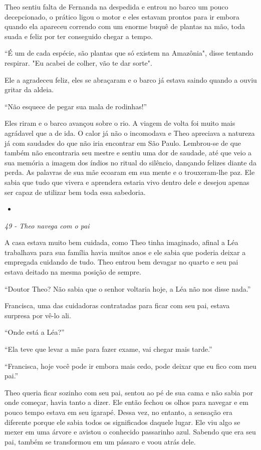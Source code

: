Theo sentiu falta de Fernanda na despedida e entrou no barco um pouco
decepcionado, o prático ligou o motor e eles estavam prontos para ir
embora quando ela apareceu correndo com um enorme buquê de plantas na
mão, toda suada e feliz por ter conseguido chegar a tempo.

``É um de cada espécie, são plantas que só existem na Amazônia", disse
tentando respirar. "Eu acabei de colher, vão te dar sorte".

Ele a agradeceu feliz, eles se abraçaram e o barco já estava saindo
quando a ouviu gritar da aldeia.

``Não esquece de pegar sua mala de rodinhas!''

Eles riram e o barco avançou sobre o rio. A viagem de volta foi muito
mais agrádavel que a de ida. O calor já não o incomodava e Theo
apreciava a natureza já com saudades do que não iria encontrar em São
Paulo. Lembrou-se de que também não encontraria seu mestre e sentiu uma
dor de saudade, até que veio a sua memória a imagem dos índios no ritual
do silêncio, dançando felizes diante da perda. As palavras de sua mãe
ecoaram em sua mente e o trouxeram-lhe paz. Ele sabia que tudo que
vivera e aprendera estaria vivo dentro dele e desejou apenas ser capaz
de utilizar bem toda essa sabedoria.

\asterisc

\begin{itemize}
\item
\end{itemize}

\emph{49 - Theo navega com o pai}

A casa estava muito bem cuidada, como Theo tinha imaginado, afinal a Léa
trabalhava para sua família havia muitos anos e ele sabia que poderia
deixar a empregada cuidando de tudo. Theo entrou bem devagar no quarto e
seu pai estava deitado na mesma posição de sempre.

``Doutor Theo? Não sabia que o senhor voltaria hoje, a Léa não nos disse
nada.''

Francisca, uma das cuidadoras contratadas para ficar com seu pai, estava
surpresa por vê-lo ali.

``Onde está a Léa?''

``Ela teve que levar a mãe para fazer exame, vai chegar mais tarde.''

``Francisca, hoje você pode ir embora mais cedo, pode deixar que eu fico
com meu pai.''

Theo queria ficar sozinho com seu pai, sentou ao pé de sua cama e não
sabia por onde começar, havia tanto a dizer. Ele então fechou os olhos
para navegar e em pouco tempo estava em seu igarapé. Dessa vez, no
entanto, a sensação era diferente porque ele sabia todos os significados
daquele lugar. Ele viu algo se mexer em uma árvore e avistou o conhecido
passarinho azul. Sabendo que era seu pai, também se transformou em um
pássaro e voou atrás dele.

